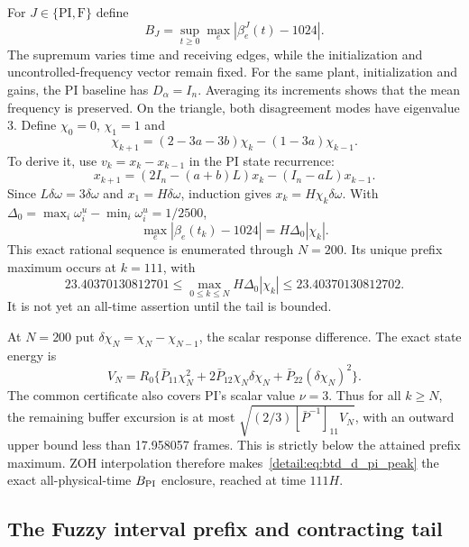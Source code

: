 For $J\in\{\mathrm{PI},\mathrm F\}$ define
\begin{equation}
 B_J=\sup_{t\ge0}\max_e|\beta_e^J(t)-1024|.
 \label{detail:eq:btd_excursion}
\end{equation}
The supremum varies time and receiving edges, while the initialization
and uncontrolled-frequency vector remain fixed. For the same plant, initialization and gains, the PI baseline has
$D_\alpha=I_n$. Averaging its increments shows that the mean frequency is
preserved. On the triangle, both disagreement modes have eigenvalue 3.
Define $\chi_0=0$, $\chi_1=1$ and
\begin{equation}
 \chi_{k+1}=(2-3a-3b)\chi_k-(1-3a)\chi_{k-1}.
 \label{detail:eq:btd_pi_scalar}
\end{equation}
To derive it, use $v_k=x_k-x_{k-1}$ in the PI state recurrence:
\[
 x_{k+1}=(2I_n-(a+b)L)x_k-(I_n-aL)x_{k-1}.
\]
Since $L\delta\omega=3\delta\omega$ and $x_1=H\delta\omega$,
induction gives $x_k=H\chi_k\delta\omega$. With
$\Delta_0=\max_i\omega_i^u-\min_i\omega_i^u=1/2500$,
\begin{equation}
 \max_e|\beta_e(t_k)-1024|=H\Delta_0|\chi_k|.
 \label{detail:eq:btd_d_pi_deviation}
\end{equation}
This exact rational sequence is enumerated through $N=200$. Its unique
prefix maximum occurs at $k=111$, with
\begin{equation}
 23.40370130812701\le
 \max_{0\le k\le N}H\Delta_0|\chi_k|\le23.40370130812702.
 \label{detail:eq:btd_d_pi_peak}
\end{equation}
It is not yet an all-time assertion until the tail is bounded.

At $N=200$ put $\delta\chi_N=\chi_N-\chi_{N-1}$, the scalar response difference. The exact state energy is
\begin{equation}
 V_N=R_0\{\bar P_{11}\chi_N^2+2\bar P_{12}\chi_N\delta\chi_N+\bar P_{22}(\delta\chi_N)^2\}.
 \label{detail:eq:btd_d_pi_VN}
\end{equation}
The common certificate also covers PI's scalar value $\nu=3$. Thus for
all $k\ge N$, the remaining buffer excursion is at most
$\sqrt{(2/3)[\bar P^{-1}]_{11}V_N}$, with an outward upper bound
less than 17.958057 frames. This is strictly below the attained prefix
maximum. ZOH interpolation therefore makes~\eqref{detail:eq:btd_d_pi_peak}
the exact all-physical-time $B_{\rm PI}$ enclosure, reached at time $111H$.

\subsection{The Fuzzy interval prefix and contracting tail}

